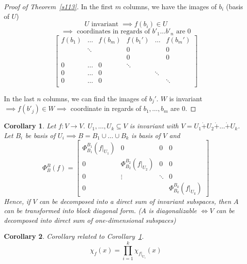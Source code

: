 \documentclass{article}
\newtheorem{corollary}{Corollary}  \numberwithin{corollary}{section}
\begin{document}
\begin{proof}[Proof of Theorem~\ref{s113}]\hfill{}
  In the first $m$ columns, we have the images of $b_i$ (basis of $U$)
  \[ U \text{ invariant } \implies f(b_i) \in U \]
  \[ \implies \text{ coordinates in regards of } b'_1 \dots b'_n \text{ are } 0 \]
  \[
    \begin{bmatrix}
      f(b_1) & \dots  & f(b_m) & f(b_1') & \dots  & f(b_m') \\
             & \ddots &        & 0       &        & 0 \\
             &        &        & 0       &        & 0 \\
      0      & \dots  & 0      & \ddots  &        & \\
      0      & \dots  & 0      &         & \ddots & \\
      0      & \dots  & 0      &         &        & \ddots \\
    \end{bmatrix}
  \]

  In the last $n$ columns, we can find the images of $b_j'$.
  $W$ is invariant $\implies f(b'_j) \in W \implies$ coordinate in regards of $b_1, \dots, b_m$ are $0$.
\end{proof}

\begin{corollary} %
  \label{k116}
  Let $f: V \to V$. $U_1, \dots, U_k \subseteq V$ is invariant with $V = U_1 \dot+ U_2 \dot+ \dots \dot+ U_k$.
  Let $B_i$ be basis of $U_i \implies B = B_1 \cup \dots \cup B_k$ is basis of $V$ and
  \[
    \Phi_B^B(f) = \left[\begin{array}{c|ccc}
      \Phi_{B_1}^{B_1}(f|_{U_1}) & 0 & 0 & 0 \\
    \hline
      0 & \Phi_{B_2}^{B_2}(f|_{U_2}) & 0 & 0 \\
      0 & \vdots & \ddots & 0 \\
      0 &   &  & \Phi_{B_k}^{B_k}(f|_{U_k})
    \end{array}\right]
  \]
  Hence, if $V$ can be decomposed into a direct sum of invariant subspaces, then $A$ can be transformed into block diagonal form.
  ($A$ is diagonalizable $\iff V$ can be decomposed into direct sum of one-dimensional subspaces)
\end{corollary}

\begin{corollary} %
  Corollary related to Corollary~\ref{k116}.
  \[ \chi_f(x) = \prod_{i=1}^k \chi_{f|_{U_i}}(x) \]
\end{corollary}
\end{document}
